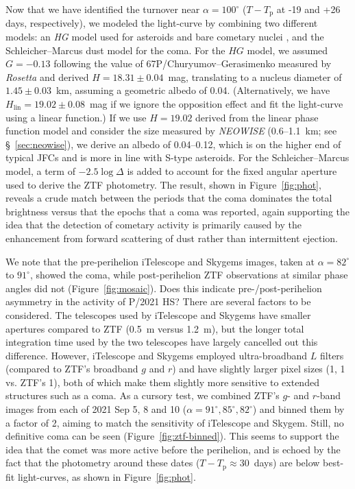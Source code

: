 \documentclass[modern]{aastex631}
\begin{document}
\begin{CJK*}{UTF8}{gbsn}
Now that we have identified the turnover near $\alpha=100^\circ$ ($T-T_\mathrm{p}$ at -19 and +26 days, respectively), we modeled the light-curve by combining two different models: an {\it HG} model used for asteroids and bare cometary nuclei \citep[where $H$ is the absolute magnitude and $G$ is slope parameter used to describe the phase curve, cf.][]{Bowell1989}, and the Schleicher--Marcus dust model for the coma. For the $HG$ model, we assumed $G=-0.13$ following the value of 67P/Churyumov--Gerasimenko measured by {\it Rosetta} \citep{Fornasier2015} and derived $H=18.31\pm0.04$~mag, translating to a nucleus diameter of $1.45\pm0.03$~km, assuming a geometric albedo of 0.04. (Alternatively, we have $H_\mathrm{lin}=19.02\pm0.08$~mag if we ignore the opposition effect and fit the light-curve using a linear function.) If we use $H=19.02$ derived from the linear phase function model \citep[in consistent with][]{Kokotanekova2017} and consider the size measured by {\it NEOWISE} (0.6--1.1~km; see \S~\ref{sec:neowise}), we derive an albedo of 0.04--0.12, which is on the higher end of typical JFCs \citep[$\lesssim0.07$; ][]{Kokotanekova2017} and is more in line with S-type asteroids. For the Schleicher--Marcus model, a term of $-2.5\log{\varDelta}$ is added to account for the fixed angular aperture used to derive the ZTF photometry. The result, shown in Figure~\ref{fig:phot}, reveals a crude match between the periods that the coma dominates the total brightness versus that the epochs that a coma was reported, again supporting the idea that the detection of cometary activity is primarily caused by the enhancement from forward scattering of dust rather than intermittent ejection.

We note that the pre-perihelion iTelescope and Skygems images, taken at $\alpha=82^\circ$ to $91^\circ$, showed the coma, while post-perihelion ZTF observations at similar phase angles did not (Figure~\ref{fig:mosaic}). Does this indicate pre-/post-perihelion asymmetry in the activity of P/2021 HS? There are several factors to be considered. The telescopes used by iTelescope and Skygems have smaller apertures compared to ZTF (0.5~m versus 1.2~m), but the longer total integration time used by the two telescopes have largely cancelled out this difference. However, iTelescope and Skygems employed ultra-broadband $L$ filters (compared to ZTF's broadband $g$ and $r$) and have slightly larger pixel sizes (1, 1 vs. ZTF's 1), both of which make them slightly more sensitive to extended structures such as a coma. As a cursory test, we combined ZTF's $g$- and $r$-band images from each of 2021 Sep 5, 8 and 10 ($\alpha=91^\circ, 85^\circ, 82^\circ$) and binned them by a factor of 2, aiming to match the sensitivity of iTelescope and Skygem. Still, no definitive coma can be seen (Figure~\ref{fig:ztf-binned}). This seems to support the idea that the comet was more active before the perihelion, and is echoed by the fact that the photometry around these dates ($T-T_\mathrm{p}\approx30$~days) are below best-fit light-curves, as shown in Figure~\ref{fig:phot}.


\end{CJK*}
\end{document}
